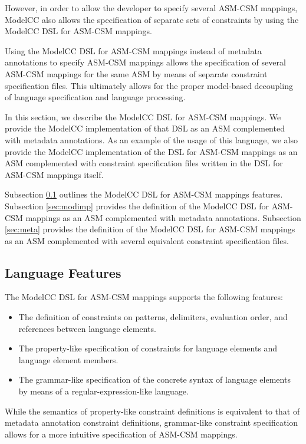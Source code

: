 \documentclass[floatfix,rmp,twocolumn,twoside]{revtex4}
\begin{document}
However, in order to allow the developer to specify several ASM-CSM mappings, ModelCC also allows the specification of separate sets of constraints by using the ModelCC DSL for ASM-CSM mappings.

Using the ModelCC DSL for ASM-CSM mappings instead of metadata annotations to specify ASM-CSM mappings allows the specification of several ASM-CSM mappings for the same ASM by means of separate constraint specification files. This ultimately allows for the proper model-based decoupling of language specification and language processing.

In this section, we describe the ModelCC DSL for ASM-CSM mappings. We provide the ModelCC implementation of that DSL as an ASM complemented with metadata annotations.
As an example of the usage of this language, we also provide the ModelCC implementation of the DSL for ASM-CSM mappings as an ASM complemented with constraint specification files written in the DSL for ASM-CSM mappings itself.

Subsection \ref{sec:langdesc} outlines the ModelCC DSL for ASM-CSM mappings features.
Subsection \ref{sec:modimp} provides the definition of the ModelCC DSL for ASM-CSM mappings as an ASM complemented with metadata annotations.
Subsection \ref{sec:meta} provides the definition of the ModelCC DSL for ASM-CSM mappings as an ASM complemented with several equivalent constraint specification files.

\subsection{Language Features} \label{sec:langdesc}

\noindent The ModelCC DSL for ASM-CSM mappings supports the following features:

\begin{itemize}
\item The definition of constraints on patterns, delimiters, evaluation order, and references between language elements.
\item The property-like specification of constraints for language elements and language element members.
\item The grammar-like specification of the concrete syntax of language elements by means of a regular-expression-like language.
\end{itemize}

While the semantics of property-like constraint definitions is equivalent to that of metadata annotation constraint definitions, grammar-like constraint specification allows for a more intuitive specification of ASM-CSM mappings.
\end{document}
